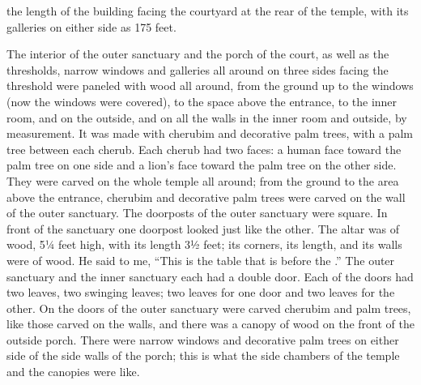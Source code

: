 {the length
of the building
facing
the courtyard
at the rear
of the temple, with its galleries
on either side
as 175 feet.
\par }{\PP The interior
of the outer sanctuary
and the porch
of the court,
as well as the thresholds,
narrow
windows
and galleries
all around
on three
sides facing
the threshold
were paneled
with wood
all
around,
from the ground
up
to the windows
(now the windows
were covered),
to the space above
the entrance,
to
the inner
room,
and on the outside,
and on
all
the walls
in the inner
room and outside,
by measurement.
It was made
with cherubim
and decorative palm trees,
with a palm tree
between
each cherub.
Each cherub
had two
faces:
a human
face
toward
the palm tree
on one side
and a lion’s
face
toward
the palm tree
on the other side.
They were carved
on
the whole
temple
all
around;
from the ground
to the area above
the entrance,
cherubim
and decorative palm trees
were carved
on the wall
of the outer sanctuary.
The doorposts
of the outer sanctuary
were square.
In front
of the sanctuary
one doorpost
looked just like the other.
The altar
was of wood,
5¼ feet
high,
with its length
3½ feet;
its corners,
its length,
and its walls
were of wood.
He said
to me,
“This
is the table
that
is before
the
{}.”
The outer sanctuary
and the inner sanctuary
each had a double
door.
Each
of the doors
had two
leaves, two
swinging
leaves;
two
leaves
for one
door and two
leaves
for the other.
On the doors
of the outer sanctuary
were carved
cherubim
and palm trees,
like those carved
on the walls,
and there was a canopy
of wood
on the front
of the outside
porch.
There were narrow
windows
and decorative palm trees
on either side
of the side
walls of the porch;
this is what the side chambers
of the temple
and the canopies were like.

}
